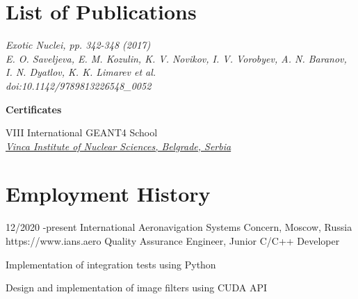 \documentclass[10pt]{article} %
\begin{document}

\section{List of Publications}

{
\textit{Exotic Nuclei, pp. 342-348 (2017)}\\
\textit{E. O. Saveljeva, E. M. Kozulin, K. V. Novikov, I. V. Vorobyev, A. N. Baranov, I. N. Dyatlov, K. K. Limarev et al.}\\
\textit{doi:10.1142/9789813226548\_0052}
}

\textbf{Certificates}

{VIII International GEANT4 School
\href{https://geant4.web.cern.ch/support/training_courses}
{\\\textit{Vinca Institute of Nuclear Sciences, Belgrade, Serbia }}  
}

\section{Employment History}

\job
{12/2020 -}{present	}
{International Aeronavigation Systems Concern, Moscow, Russia}
{https://www.ians.aero}
{Quality Assurance Engineer, Junior C/C++ Developer }
{
\begin{itemize-noindent}
\item{Implementation of integration tests using Python}
\item{Design and implementation of image filters using CUDA API }
\end{itemize-noindent}
}
\end{document}
